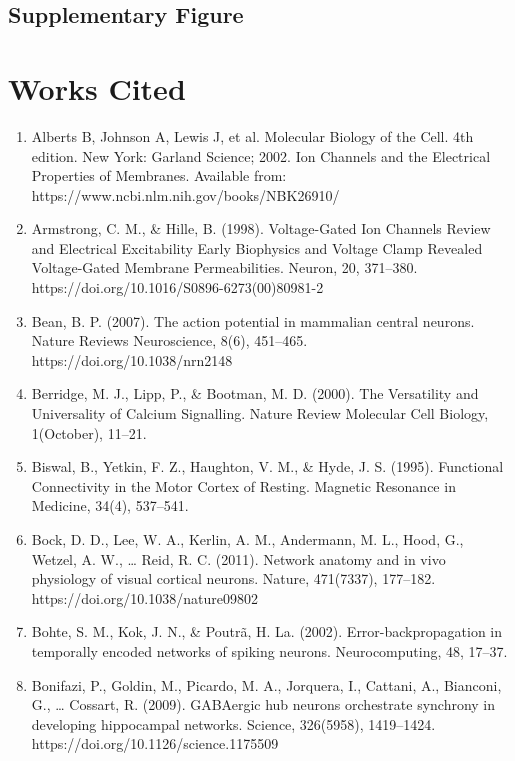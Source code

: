 \documentclass[11pt,titlepage]{article}
\begin{document}
\subsection{Supplementary Figure}

\clearpage
\section{Works Cited}


\begin{spacing}{1}
\begin{enumerate}
\item Alberts B, Johnson A, Lewis J, et al. Molecular Biology of the Cell. 4th edition. New York: Garland Science; 2002. Ion Channels and the Electrical Properties of Membranes. Available from: https://www.ncbi.nlm.nih.gov/books/NBK26910/
\item Armstrong, C. M., \& Hille, B. (1998). Voltage-Gated Ion Channels Review and Electrical Excitability Early Biophysics and Voltage Clamp Revealed Voltage-Gated Membrane Permeabilities. Neuron, 20, 371–380.\\ https://doi.org/10.1016/S0896-6273(00)80981-2
\item Bean, B. P. (2007). The action potential in mammalian central neurons. Nature Reviews Neuroscience, 8(6), 451–465. https://doi.org/10.1038/nrn2148
\item Berridge, M. J., Lipp, P., \& Bootman, M. D. (2000). The Versatility and Universality of Calcium Signalling. Nature Review Molecular Cell Biology, 1(October), 11–21.
\item Biswal, B., Yetkin, F. Z., Haughton, V. M., \& Hyde, J. S. (1995). Functional Connectivity in the Motor Cortex of Resting. Magnetic Resonance in Medicine, 34(4), 537–541.
\item Bock, D. D., Lee, W. A., Kerlin, A. M., Andermann, M. L., Hood, G., Wetzel, A. W., … Reid, R. C. (2011). Network anatomy and in vivo physiology of visual cortical neurons. Nature, 471(7337), 177–182. https://doi.org/10.1038/nature09802
\item Bohte, S. M., Kok, J. N., \& Poutrã, H. La. (2002). Error-backpropagation in temporally encoded networks of spiking neurons. Neurocomputing, 48, 17–37.
\item Bonifazi, P., Goldin, M., Picardo, M. A., Jorquera, I., Cattani, A., Bianconi, G., … Cossart, R. (2009). GABAergic hub neurons orchestrate synchrony in developing hippocampal networks. Science, 326(5958), 1419–1424. https://doi.org/10.1126/science.1175509

\end{enumerate}
\end{spacing}
\end{document}
